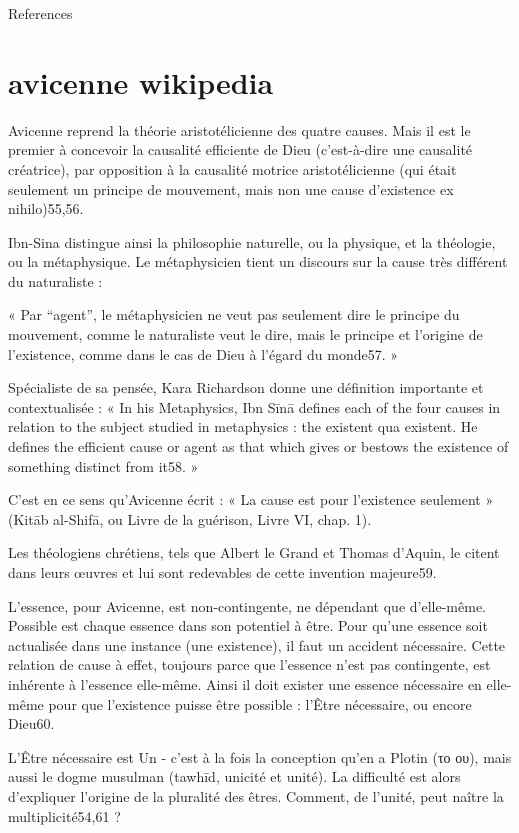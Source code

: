 References

\section{avicenne wikipedia}

Avicenne reprend la théorie aristotélicienne des quatre causes. Mais il est le premier à concevoir la causalité efficiente de Dieu (c'est-à-dire une causalité créatrice), par opposition à la causalité motrice aristotélicienne (qui était seulement un principe de mouvement, mais non une cause d'existence ex nihilo)55,56.

Ibn-Sina distingue ainsi la philosophie naturelle, ou la physique, et la théologie, ou la métaphysique. Le métaphysicien tient un discours sur la cause très différent du naturaliste :

« Par “agent”, le métaphysicien ne veut pas seulement dire le principe du mouvement, comme le naturaliste veut le dire, mais le principe et l'origine de l'existence, comme dans le cas de Dieu à l'égard du monde57. »

Spécialiste de sa pensée, Kara Richardson donne une définition importante et contextualisée : « In his Metaphysics, Ibn Sīnā defines each of the four causes in relation to the subject studied in metaphysics : the existent qua existent. He defines the efficient cause or agent as that which gives or bestows the existence of something distinct from it58. »

C'est en ce sens qu'Avicenne écrit : « La cause est pour l’existence seulement » (Kitāb al-Shifā, ou Livre de la guérison, Livre VI, chap. 1).

Les théologiens chrétiens, tels que Albert le Grand et Thomas d'Aquin, le citent dans leurs œuvres et lui sont redevables de cette invention majeure59.

L'essence, pour Avicenne, est non-contingente, ne dépendant que d'elle-même. Possible est chaque essence dans son potentiel à être. Pour qu'une essence soit actualisée dans une instance (une existence), il faut un accident nécessaire. Cette relation de cause à effet, toujours parce que l'essence n'est pas contingente, est inhérente à l'essence elle-même. Ainsi il doit exister une essence nécessaire en elle-même pour que l'existence puisse être possible : l'Être nécessaire, ou encore Dieu60.

L'Être nécessaire est Un - c'est à la fois la conception qu'en a Plotin (το ου), mais aussi le dogme musulman (tawhīd, unicité et unité). La difficulté est alors d'expliquer l'origine de la pluralité des êtres. Comment, de l'unité, peut naître la multiplicité54,61 ?

